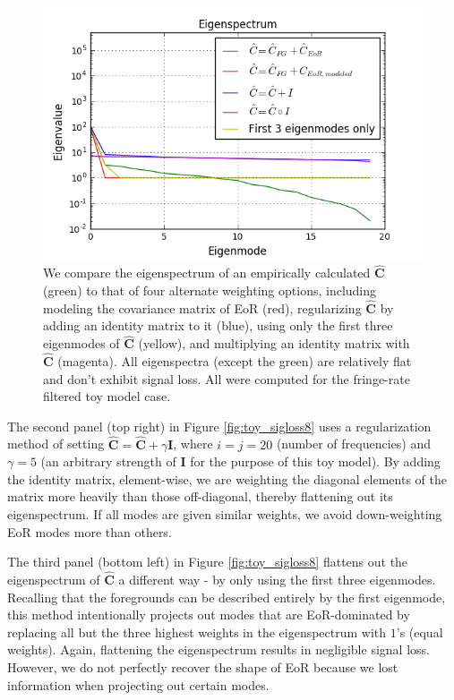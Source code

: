 \documentclass[preprint2,numberedappendix,tighten]{aastex6}  %
\begin{document}
\begin{figure}
	\centering
	\includegraphics[trim={0.3cm 0.3cm 0.3cm 0.3cm},clip,width=\columnwidth]{plots/toy_sigloss14.png}
	\caption{We compare the eigenspectrum of an empirically calculated $\hat{\textbf{C}}$ (green) to that of four alternate weighting options, including modeling the covariance matrix of EoR (red), regularizing $\hat{\textbf{C}}$ by adding an identity matrix to it (blue), using only the first three eigenmodes of $\hat{\textbf{C}}$ (yellow), and multiplying an identity matrix with $\hat{\textbf{C}}$ (magenta). All eigenspectra (except the green) are relatively flat and don't exhibit signal loss. All were computed for the fringe-rate filtered toy model case.}
	\label{fig:toy_sigloss14}
\end{figure}

The second panel (top right) in Figure \ref{fig:toy_sigloss8} uses a regularization method of setting $\hat{\textbf{C}} = \hat{\textbf{C}} + \gamma\textbf{I}$, where $i$$=$$j$$=$$20$ (number of frequencies) and $\gamma = 5$ (an arbitrary strength of $\textbf{I}$ for the purpose of this toy model). By adding the identity matrix, element-wise, we are weighting the diagonal elements of the matrix more heavily than those off-diagonal, thereby flattening out its eigenspectrum. If all modes are given similar weights, we avoid down-weighting EoR modes more than others.  

The third panel (bottom left) in Figure \ref{fig:toy_sigloss8} flattens out the eigenspectrum of $\hat{\textbf{C}}$ a different way - by only using the first three eigenmodes. Recalling that the foregrounds can be described entirely by the first eigenmode, this method intentionally projects out modes that are EoR-dominated by replacing all but the three highest weights in the eigenspectrum with $1$'s (equal weights). Again, flattening the eigenspectrum results in negligible signal loss. However, we do not perfectly recover the shape of EoR because we lost information when projecting out certain modes. 
\end{document}
